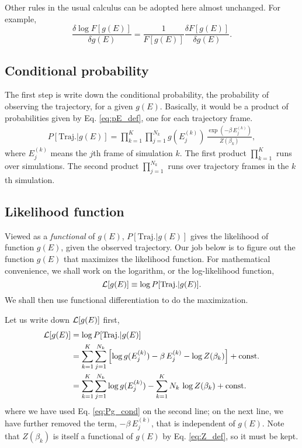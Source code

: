 \documentclass[aip,jcp,preprint,superscriptaddress]{revtex4-1}
\begin{document}
Other rules in the usual calculus
can be adopted here almost unchanged.
%
For example,
\begin{equation}
\frac{ \delta \log F[g(E)] }
     { \delta g(E) }
=
\frac{ 1 } { F[g(E)] }
\frac{ \delta F[g(E)] }
     { \delta g(E) }.
\label{eq:funcdiff_logF}
\end{equation}




\subsection{Conditional probability}



The first step is write down the conditional probability,
the probability of observing the trajectory,
for a given $g(E)$.
%
Basically,
it would be a product of
probabilities given by Eq. \eqref{eq:pE_def},
one for each trajectory frame.
%
\begin{align}
P[\mathrm{Traj.}|g(E)]
=
\prod_{k = 1}^K
\prod_{j = 1}^{N_k}
g(E^{(k)}_j) \, \frac{ \exp(-\beta \, E^{(k)}_j) } { Z(\beta_k) },
\label{eq:Pg_cond}
\end{align}
%
where
$E^{(k)}_j$
means the $j$th frame of simulation $k$.
%
The first product $\prod_{k=1}^K$
runs over simulations.
%
The second product $\prod_{j=1}^{N_k}$
runs over trajectory frames in the $k$th simulation.




\subsection{Likelihood function}



Viewed as a \emph{functional} of $g(E)$,
$P[\mathrm{Traj.}|g(E)]$
gives the likelihood of function $g(E)$,
given the observed trajectory.
%
Our job below is to figure out the function $g(E)$
that maximizes the likelihood function.
%
For mathematical convenience,
we shall work on the logarithm,
or the log-likelihood function,
\[
  \mathcal{L}[g(E)]
  \equiv
  \log P[\mathrm{Traj.}|g(E)].
\]
%
We shall then use functional differentiation
to do the maximization.
%





Let us write down $\mathcal{L}[g(E)]$ first,
%
\begin{align}
\mathcal{L}[g(E)]
&=
\log P[\mathrm{Traj.} | g(E)]
\notag \\
&=
\sum_{k = 1}^K
\sum_{j = 1}^{N_k}
  \left[
  \log g( E^{(k)}_j )
  -\beta \, E^{(k)}_j
  - \log Z(\beta_k)
\right]
+\mathrm{const.}
\notag \\
&=
\sum_{k = 1}^K
\sum_{j = 1}^{N_k}
\log g( E^{(k)}_j )
-
\sum_{k = 1}^K
N_k \,
\log Z(\beta_k)
+\mathrm{const.}
\end{align}
where
we have used Eq. \eqref{eq:Pg_cond}
on the second line;
on the next line,
we have further removed
the term, $-\beta \, E^{(k)}_j$,
that is independent of $g(E)$.
%
Note that
$Z(\beta_k)$ is
itself a functional of $g(E)$
by Eq. \eqref{eq:Z_def},
so it must be kept.
\end{document}
